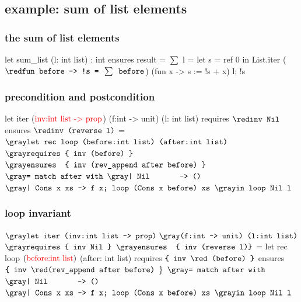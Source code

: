 \documentclass[xcolor=dvipsnames]{beamer}
\begin{document}
\subsection*{example: sum of list elements} 
\begin{frame}[fragile]
\frametitle{the sum of list elements}
\begin{footnotesize}
\begin{whycode}
 let sum_list (l: int list) : int
 ensures { result = $\sum$ l }
 = let s = ref 0 in
   List.iter 
     (${\red\texttt{fun before -> !s = }\sum \texttt{ before}}$) (fun x -> s := !s + x) l; 
   !s     
\end{whycode}
\end{footnotesize}
\end{frame}

\begin{frame}[fragile]
\frametitle{precondition and postcondition}
\begin{footnotesize}
\begin{whycode}
let iter ($\textcolor{red}{\text{inv:int list -> prop}}$) (f:int -> unit) (l: int list)
requires { ${\red \texttt{inv Nil}}$ }
ensures  { ${\red \texttt{inv (reverse l)}}$ } 
= ${\gray\texttt{let rec loop (before:int list) (after:int list)}}$
  ${\gray\texttt{requires \{ inv (before) \} }}$
  ${\gray\texttt{ensures~ \{ inv (rev\_append after before) \}}}$  
  ${\gray\texttt{= match after with}}$
     ${\gray\texttt{| Nil~~~~~~ -> ()}}$
     ${\gray\texttt{| Cons x xs -> f x; loop (Cons x before) xs}}$
  ${\gray\texttt{in loop Nil l }}$
\end{whycode}
\end{footnotesize}
\end{frame}
\addtocounter{framenumber}{-1}



\begin{frame}[fragile]
\frametitle{loop invariant}
\begin{footnotesize}
\begin{whycode}
${\gray\texttt{let iter (inv:int list -> prop)}} ~
{\gray\texttt{(f:int -> unit) (l:int list)}}$
${\gray\texttt{requires \{ inv Nil \}}}$
${\gray\texttt{ensures~ \{ inv (reverse l)\}}}$    
= let rec loop $(\textcolor{red}{\text{before:int list}})$ (after: int list) 
  requires $\texttt{\{ inv {\red (before)} \}}$
  ensures  $\texttt{\{ inv {\red(rev\_append after before)} }\}$  
  ${\gray\texttt{= match after with}}$
     ${\gray\texttt{| Nil~~~~~~ -> ()}}$
     ${\gray\texttt{| Cons x xs -> f x; loop (Cons x before) xs}}$
  ${\gray\texttt{in loop Nil l }}$
\end{whycode}
\end{footnotesize}
\end{frame}
\addtocounter{framenumber}{-1}
\end{document}
